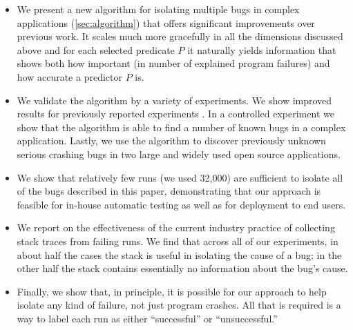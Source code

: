 \documentclass[final]{sigplanconf}
\begin{document}
\begin{itemize}

\item We present a new algorithm for isolating multiple bugs in
complex applications (\autoref{sec:algorithm})
that offers significant improvements over previous work.
It scales much more gracefully in all the dimensions discussed above
and for each selected predicate $P$ it naturally yields information
that shows both how important (in number of explained program
failures) and how accurate a predictor $P$ is.

\item We validate the algorithm by a variety of experiments.  We show
improved results for previously reported experiments
\cite{PLDI`03*141}.  In a
controlled experiment we show that the algorithm is able to find a
number of known bugs in a complex application.  Lastly, we use
the algorithm to discover previously unknown serious crashing bugs in
two large and widely used open source applications.

\item We show that relatively few runs (we used 32,000) are sufficient
to isolate all of the bugs described in this paper, demonstrating that our
approach is feasible for in-house automatic testing as well as for
deployment to end users.

\item We report on the effectiveness of the current industry practice
of collecting stack traces from failing runs.  We find that across all
of our experiments, in about half the cases the stack is useful in
isolating the cause of a bug; in the other half the stack contains
essentially no information about the bug's cause.

\item Finally, we show that, in principle, it is possible for our
approach to help isolate any kind of failure, not just program
crashes.  All that is required is a way to label each run as either
``successful'' or ``unsuccessful.''

\end{itemize}
\end{document}
